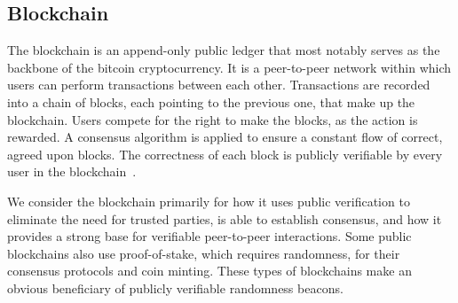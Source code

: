 \subsection{Blockchain}\label{subsec:blockchain}

The blockchain is an append-only public ledger that most notably serves as the backbone of the bitcoin cryptocurrency.
It is a peer-to-peer network within which users can perform transactions between each other.
Transactions are recorded into a chain of blocks, each pointing to the previous one, that make up the blockchain.
Users compete for the right to make the blocks, as the action is rewarded.
A consensus algorithm is applied to ensure a constant flow of correct, agreed upon blocks.
The correctness of each block is publicly verifiable by every user in the blockchain~\cite{nakamoto2008bitcoin}.

We consider the blockchain primarily for how it uses public verification to eliminate the need for trusted parties, is able to establish consensus, and how it provides a strong base for verifiable peer-to-peer interactions.
Some public blockchains also use proof-of-stake, which requires randomness, for their consensus protocols and coin minting.
These types of blockchains make an obvious beneficiary of publicly verifiable randomness beacons.
